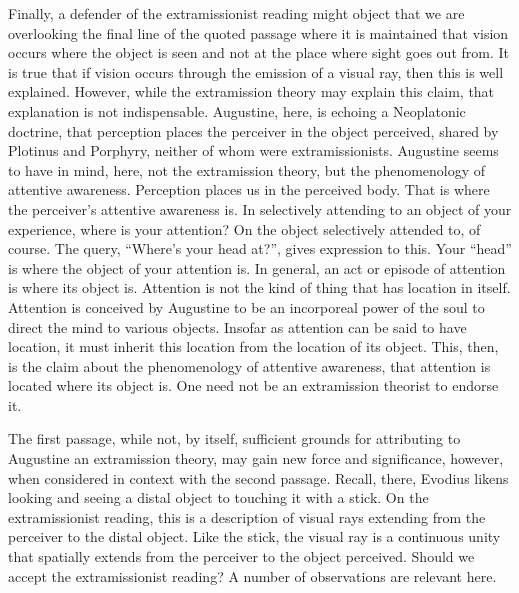 \documentclass[12pt]{article}
\begin{document}
Finally, a defender of the extramissionist reading might object that we are overlooking the final line of the quoted passage where it is maintained that vision occurs where the object is seen and not at the place where sight goes out from. It is true that if vision occurs through the emission of a visual ray, then this is well explained. However, while the extramission theory may explain this claim, that explanation is not indispensable. Augustine, here, is echoing a Neoplatonic doctrine, that perception places the perceiver in the object perceived, shared by Plotinus and Porphyry, neither of whom were extramissionists. Augustine seems to have in mind, here, not the extramission theory, but the phenomenology of attentive awareness. Perception places us in the perceived body. That is where the perceiver’s attentive awareness is. In selectively attending to an object of your experience, where is your attention? On the object selectively attended to, of course. The query, ``Where’s your head at?'', gives expression to this. Your ``head'' is where the object of your attention is. In general, an act or episode of attention is where its object is. Attention is not the kind of thing that has location in itself. Attention is conceived by Augustine to be an incorporeal power of the soul to direct the mind to various objects. Insofar as attention can be said to have location, it must inherit this location from the location of its object. This, then, is the claim about the phenomenology of attentive awareness, that attention is located where its object is. One need not be an extramission theorist to endorse it.

The first passage, while not, by itself, sufficient grounds for attributing to Augustine an extramission theory, may gain new force and significance, however, when considered in context with the second passage. Recall, there, Evodius likens looking and seeing a distal object to touching it with a stick. On the extramissionist reading, this is a description of visual rays extending from the perceiver to the distal object. Like the stick, the visual ray is a continuous unity that spatially extends from the perceiver to the object perceived. Should we accept the extramissionist reading? A number of observations are relevant here.
\end{document}
